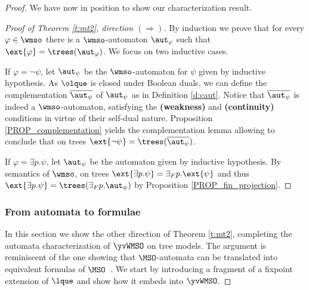 \begin{proof}
We have now in position to show our characterization result.

\begin{proof}[Proof of Theorem \ref{t:mt2}, direction $(\Rightarrow)$]
By induction we prove that for every $\varphi \in \wmso$ there is a $\wmso$-automaton $\aut_\varphi$ such that $\ext{\varphi} = \trees(\aut_\varphi)$. We focus on two %
inductive cases.

  \indent If $\varphi = \neg \psi$, let $\aut_{\psi}$ be the $\wmso$-automaton for $\psi$ given by inductive hypothesis. As $\olque$ is closed under Boolean duals, we can define the complementation $\overline{\aut_{\psi}}$ of $\aut_{\psi}$ as in Definition \ref{d:caut}. Notice that $\overline{\aut_{\psi}}$ is indeed a $\wmso$-automaton, satisfying the \textbf{(weakness)} and \textbf{(continuity)} conditions in virtue of their self-dual nature. Proposition \ref{PROP_complementation} yields the complementation lemma allowing to conclude that on trees $\ext{\neg \psi} = \trees(\overline{\aut_{\psi}})$.

\indent   If $\varphi = \exists p.\psi$, let $\aut_{\psi}$ be the automaton given by inductive hypothesis. By semantics of $\wmso$, on trees $\ext{\exists p. \psi} = {{\exists}_F p}.\ext{\psi}$ and thus $\ext{\exists p.\psi} = \trees({{\exists}_F p}.\aut_{\psi})$ by Proposition \ref{PROP_fin_projection}.
\end{proof} 



\subsubsection{From automata to formulae}


In this section we show the other direction of Theorem \ref{t:mt2}, completing
the automata characterization of $\yvWMSO$ on tree models.
The argument is reminiscent of the one showing that $\MSO$-automata can be
translated into equivalent formulas of $\MSO$~\cite{Walukiewicz96}.
We start by introducing a fragment of a fixpoint extension
of $\lque$ and show how it embeds into $\yvWMSO$.


\end{proof}

